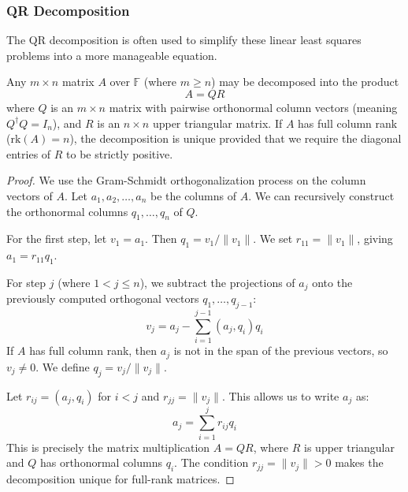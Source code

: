 \subsubsection{QR Decomposition} 

  The QR decomposition is often used to simplify these linear least squares problems into a more manageable equation. 

  \begin{definition}[QR Decomposition]
    Any $m \times n$ matrix $A$ over $\mathbb{F}$ (where $m \geq n$) may be decomposed into the product
    \begin{equation}
      A = QR
    \end{equation}
    where $Q$ is an $m \times n$ matrix with pairwise orthonormal column vectors (meaning $Q^\dagger Q = I_n$), and $R$ is an $n \times n$ upper triangular matrix. If $A$ has full column rank ($\text{rk}(A) = n$), the decomposition is unique provided that we require the diagonal entries of $R$ to be strictly positive. 
  \end{definition}
  \begin{proof}
    We use the Gram-Schmidt orthogonalization process on the column vectors of $A$. Let $a_1, a_2, \dots, a_n$ be the columns of $A$. We can recursively construct the orthonormal columns $q_1, \dots, q_n$ of $Q$. 
    
    For the first step, let $v_1 = a_1$. Then $q_1 = v_1 / \|v_1\|$. We set $r_{11} = \|v_1\|$, giving $a_1 = r_{11} q_1$. 

    For step $j$ (where $1 < j \leq n$), we subtract the projections of $a_j$ onto the previously computed orthogonal vectors $q_1, \dots, q_{j-1}$:
    \begin{equation}
      v_j = a_j - \sum_{i=1}^{j-1} (a_j, q_i) q_i
    \end{equation}
    If $A$ has full column rank, then $a_j$ is not in the span of the previous vectors, so $v_j \neq 0$. We define $q_j = v_j / \|v_j\|$. 

    Let $r_{ij} = (a_j, q_i)$ for $i < j$ and $r_{jj} = \|v_j\|$. This allows us to write $a_j$ as:
    \begin{equation}
      a_j = \sum_{i=1}^j r_{ij} q_i
    \end{equation}
    This is precisely the matrix multiplication $A = QR$, where $R$ is upper triangular and $Q$ has orthonormal columns $q_i$. The condition $r_{jj} = \|v_j\| > 0$ makes the decomposition unique for full-rank matrices.
  \end{proof}

